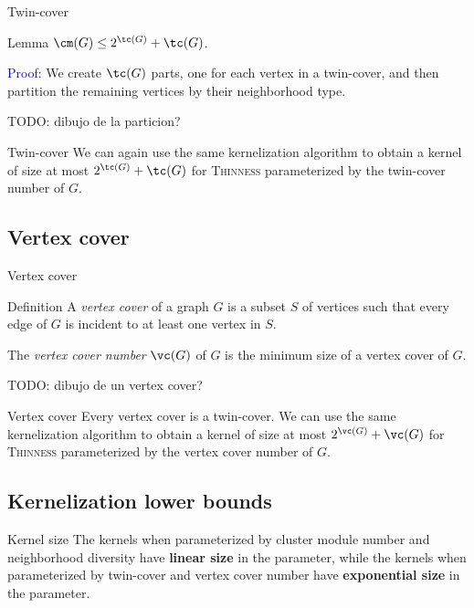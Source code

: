 \documentclass{beamer}
\begin{document}
\begin{frame}{Twin-cover}
    \begin{block}{Lemma}
        $\cm(G) \leq 2^{\tc(G)} + \tc(G)$.
    \end{block}

    \textcolor{blue}{Proof:} We create $\tc(G)$ parts, one for each vertex in a twin-cover, and then partition the remaining vertices by their neighborhood type.

    TODO: dibujo de la particion?
\end{frame}


\begin{frame}{Twin-cover}
    We can again use the same kernelization algorithm to obtain a kernel of size at most $2^{\tc(G)} + \tc(G)$ for \textsc{Thinness} parameterized by the twin-cover number of $G$.
\end{frame}

\subsection{Vertex cover}
\begin{frame}{Vertex cover}
    \begin{block}{Definition}
        A \emph{vertex cover} of a graph $G$ is a subset $S$ of vertices such that every edge of $G$ is incident to at least one vertex in $S$.

        The \emph{vertex cover number} $\vc(G)$ of $G$ is the minimum size of a vertex cover of $G$.
    \end{block}
    TODO: dibujo de un vertex cover?
\end{frame}

\begin{frame}{Vertex cover}
    Every vertex cover is a twin-cover.
    We can use the same kernelization algorithm to obtain a kernel of size at most $2^{\vc(G)} + \vc(G)$ for \textsc{Thinness} parameterized by the vertex cover number of $G$.
\end{frame}

\subsection{Kernelization lower bounds}
\begin{frame}{Kernel size}
    The kernels when parameterized by cluster module number and neighborhood diversity have \textbf{linear size} in the parameter, while the kernels when parameterized by twin-cover and vertex cover number have \textbf{exponential size} in the parameter.


\end{frame}
\end{document}
